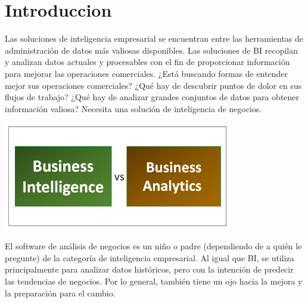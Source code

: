 \section{Introduccion}
\item{Las soluciones de inteligencia empresarial se encuentran entre las herramientas de administración de datos más valiosas disponibles. Las soluciones de BI recopilan y analizan datos actuales y procesables con el fin de proporcionar información para mejorar las operaciones comerciales. ¿Está buscando formas de entender mejor sus operaciones comerciales? ¿Qué hay de descubrir puntos de dolor en sus flujos de trabajo? ¿Qué hay de analizar grandes conjuntos de datos para obtener información valiosa? Necesita una solución de inteligencia de negocios. }
\begin{center}
\includegraphics[width=10cm]{./Imagenes/bivsba}
\end{center}
El software de análisis de negocios es un niño o padre (dependiendo de a quién le pregunte) de la categoría de inteligencia empresarial. Al igual que BI, se utiliza principalmente para analizar datos históricos, pero con la intención de predecir las tendencias de negocios. Por lo general, también tiene un ojo hacia la mejora y la preparación para el cambio. 

